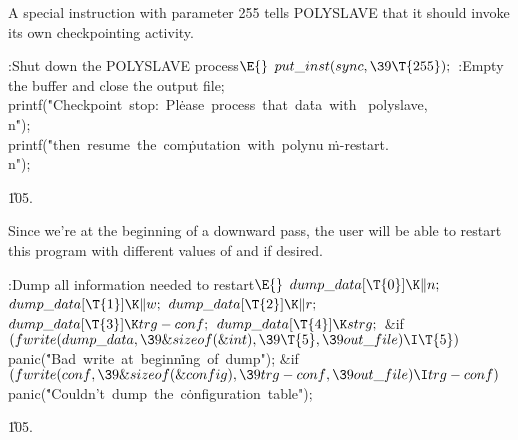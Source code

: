 A special  instruction with parameter 255
tells {\mc POLYSLAVE}
that it should invoke its own checkpointing activity.

\Y\B\4:Shut down the {\mc POLYSLAVE} process\X${}\E{}$\6
$\\{put\_inst}(\\{sync},\39\T{255});{}$\6
:Empty the buffer and close the output file\X;\6
\\{printf}(\.{"Checkpoint\ stop:\ Pl}\)\.{ease\ process\ that\ da}\)\.{ta\ with%
\ polyslave,\\n}\)\.{"});\6
\\{printf}(\.{"then\ resume\ the\ com}\)\.{putation\ with\ polynu}\)%
\.{m-restart.\\n"});\par
\U105.\fi

Since we're at the beginning of a downward pass, the
user will be
able to restart this program with different values of  and
 if desired.

\Y\B\4:Dump all information needed to restart\X${}\E{}$\6
$\\{dump\_data}[\T{0}]\K\|n;{}$\6
${}\\{dump\_data}[\T{1}]\K\|w;{}$\6
${}\\{dump\_data}[\T{2}]\K\|r;{}$\6
${}\\{dump\_data}[\T{3}]\K\\{trg}-\\{conf};{}$\6
${}\\{dump\_data}[\T{4}]\K\\{strg};{}$\6
\&{if} ${}(\\{fwrite}(\\{dump\_data},\39\&{sizeof}(\&{int}),\39\T{5},\39\\{out%
\_file})\I\T{5}){}$\1\5
\\{panic}(\.{"Bad\ write\ at\ beginn}\)\.{ing\ of\ dump"});\2\6
\&{if} ${}(\\{fwrite}(\\{conf},\39\&{sizeof}(\&{config}),\39\\{trg}-\\{conf},%
\39\\{out\_file})\I\\{trg}-\\{conf}){}$\1\5
\\{panic}(\.{"Couldn't\ dump\ the\ c}\)\.{onfiguration\ table"});\2\par
\U105.\fi

